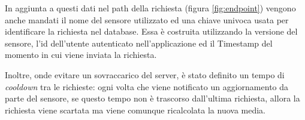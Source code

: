 In aggiunta a questi dati nel path della richiesta (figura \ref{fig:endpoint}) vengono anche mandati il nome del sensore utilizzato ed una chiave univoca usata per identificare la richiesta nel database. Essa è costruita utilizzando la versione del sensore, l'id dell'utente autenticato nell'applicazione ed il Timestamp del momento in cui viene inviata la richiesta.

Inoltre, onde evitare un sovraccarico del server, è stato definito un tempo di \textit{cooldown} tra le richieste: ogni volta che viene notificato un aggiornamento da parte del sensore, se questo tempo non è trascorso dall'ultima richiesta, allora la richiesta viene scartata ma viene comunque ricalcolata la nuova media.
